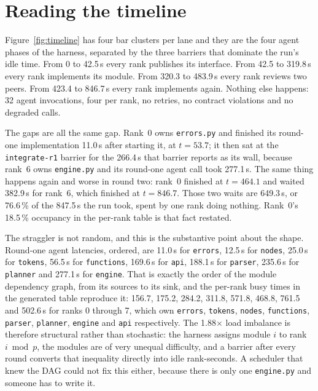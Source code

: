 \documentclass[11pt]{article}
\begin{document}


\section{Reading the timeline}

Figure~\ref{fig:timeline} has four bar clusters per lane and they are the four agent phases of
the harness, separated by the three barriers that dominate the run's idle time. From 0 to
42.5\,s every rank publishes its interface. From 42.5 to 319.8\,s every rank implements its
module. From 320.3 to 483.9\,s every rank reviews two peers. From 423.4 to 846.7\,s every rank
implements again. Nothing else happens: 32 agent invocations, four per rank, no retries, no
contract violations and no degraded calls.

The gaps are all the same gap. Rank~0 owns \texttt{errors.py} and finished its round-one
implementation 11.0\,s after starting it, at $t=53.7$; it then sat at the \texttt{integrate-r1}
barrier for the 266.4\,s that barrier reports as its wall, because rank~6 owns
\texttt{engine.py} and its round-one agent call took 277.1\,s. The same thing happens again and
worse in round two: rank~0 finished at $t=464.1$ and waited 382.9\,s for rank~6, which finished
at $t=846.7$. Those two waits are 649.3\,s, or 76.6\,\% of the 847.5\,s the run took, spent by
one rank doing nothing. Rank~0's 18.5\,\% occupancy in the per-rank table is that fact restated.

The straggler is not random, and this is the substantive point about the shape. Round-one agent
latencies, ordered, are 11.0\,s for \texttt{errors}, 12.5\,s for \texttt{nodes}, 25.0\,s for
\texttt{tokens}, 56.5\,s for \texttt{functions}, 169.6\,s for \texttt{api}, 188.1\,s for
\texttt{parser}, 235.6\,s for \texttt{planner} and 277.1\,s for \texttt{engine}. That is exactly
the order of the module dependency graph, from its sources to its sink, and the per-rank busy
times in the generated table reproduce it: 156.7, 175.2, 284.2, 311.8, 571.8, 468.8, 761.5 and
502.6\,s for ranks 0 through 7, which own \texttt{errors}, \texttt{tokens}, \texttt{nodes},
\texttt{functions}, \texttt{parser}, \texttt{planner}, \texttt{engine} and \texttt{api}
respectively. The 1.88$\times$ load imbalance is therefore structural rather than stochastic:
the harness assigns module $i$ to rank $i \bmod p$, the modules are of very unequal difficulty,
and a barrier after every round converts that inequality directly into idle rank-seconds. A
scheduler that knew the DAG could not fix this either, because there is only one
\texttt{engine.py} and someone has to write it.
\end{document}
